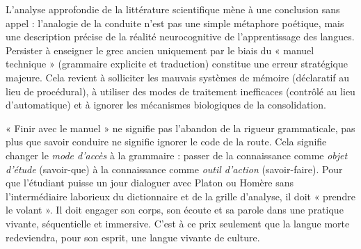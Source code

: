 L'analyse approfondie de la littérature scientifique mène à une conclusion sans appel : l'analogie
de la conduite n'est pas une simple métaphore poétique, mais une description précise de la réalité
neurocognitive de l'apprentissage des langues. Persister à enseigner le grec ancien uniquement par
le biais du « manuel technique » (grammaire explicite et traduction) constitue une erreur
stratégique majeure. Cela revient à solliciter les mauvais systèmes de mémoire (déclaratif au lieu
de procédural), à utiliser des modes de traitement inefficaces (contrôlé au lieu d'automatique) et à
ignorer les mécanismes biologiques de la consolidation.

« Finir avec le manuel » ne signifie pas l'abandon de la rigueur grammaticale, pas plus que savoir
conduire ne signifie ignorer le code de la route. Cela signifie changer le \textit{mode d'accès} à
la grammaire : passer de la connaissance comme \textit{objet d'étude} (savoir-que) à la connaissance
comme \textit{outil d'action} (savoir-faire). Pour que l'étudiant puisse un jour dialoguer avec
Platon ou Homère sans l'intermédiaire laborieux du dictionnaire et de la grille d'analyse, il doit «
prendre le volant ». Il doit engager son corps, son écoute et sa parole dans une pratique vivante,
séquentielle et immersive. C'est à ce prix seulement que la langue morte redeviendra, pour son
esprit, une langue vivante de culture.

